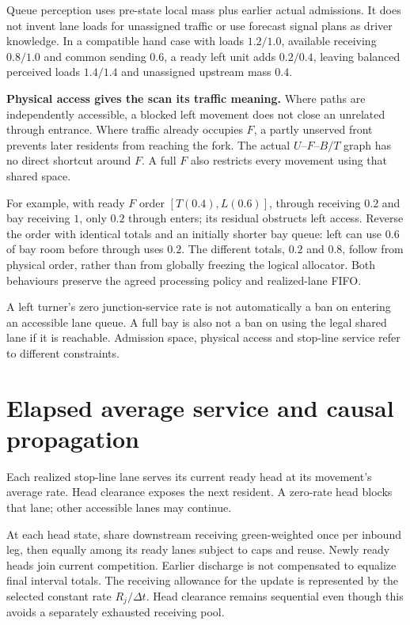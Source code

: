 \documentclass[11pt,a4paper]{article}
\begin{document}
Queue perception uses pre-state local mass plus earlier actual admissions.
It does not invent lane loads for unassigned traffic or use forecast
signal plans as driver knowledge. In a compatible hand case with loads
$1.2/1.0$, available receiving $0.8/1.0$ and common sending $0.6$,
a ready left unit adds $0.2/0.4$, leaving balanced perceived loads
$1.4/1.4$ and unassigned upstream mass $0.4$.

\textbf{Physical access gives the scan its traffic meaning.}
Where paths are independently accessible, a blocked left movement does not
close an unrelated through entrance. Where traffic already occupies $F$,
a partly unserved front prevents later residents from reaching the fork.
The actual $U$--$F$--$B/T$ graph has no direct shortcut around $F$.
A full $F$ also restricts every movement using that shared space.

For example, with ready $F$ order $[T(0.4),L(0.6)]$, through receiving
$0.2$ and bay receiving $1$, only $0.2$ through enters; its residual
obstructs left access. Reverse the order with identical totals and an
initially shorter bay queue: left can use $0.6$ of bay room before
through uses $0.2$. The different totals, $0.2$ and $0.8$, follow from
physical order, rather than from globally freezing the logical allocator.
Both behaviours preserve the agreed processing policy and realized-lane FIFO.

A left turner's zero junction-service rate is not automatically a ban
on entering an accessible lane queue. A full bay is also not a ban on
using the legal shared lane if it is reachable. Admission space,
physical access and stop-line service refer to different constraints.

\section{Elapsed average service and causal propagation}

Each realized stop-line lane serves its current ready head at its
movement's average rate. Head clearance exposes the next resident.
A zero-rate head blocks that lane; other accessible lanes may continue.

At each head state, share downstream receiving green-weighted once per
inbound leg, then equally among its ready lanes subject to caps and
reuse. Newly ready heads join current competition. Earlier discharge
is not compensated to equalize final interval totals. The receiving
allowance for the update is represented by the selected constant rate
$R_j/\Delta t$. Head clearance remains sequential even though this avoids
a separately exhausted receiving pool.
\end{document}
